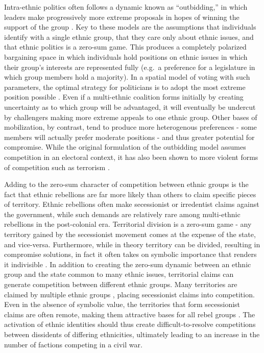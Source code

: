 \documentclass[12pt,]{book}
\begin{document}
Intra-ethnic politics often follows a dynamic known as ``outbidding,''
in which leaders make progressively more extreme proposals in hopes of
winning the support of the group \citep{Rabushka1972, horowitz85}. Key
to these models are the assumptions that individuals identify with a
single ethnic group, that they care only about ethnic issues, and that
ethnic politics is a zero-sum game. This produces a completely polarized
bargaining space in which individuals hold positions on ethnic issues in
which their group's interests are represented fully (e.g.~a preference
for a legislature in which group members hold a majority). In a spatial
model of voting with such parameters, the optimal strategy for
politicians is to adopt the most extreme position possible
\citep{Rabushka1972}. Even if a multi-ethnic coalition forms initially
by creating uncertainty as to which group will be advantaged, it will
eventually be undercut by challengers making more extreme appeals to one
ethnic group. Other bases of mobilization, by contrast, tend to produce
more heterogenous preferences - some members will actually prefer
moderate positions - and thus greater potential for compromise. While
the original formulation of the outbidding model assumes competition in
an electoral context, it has also been shown to more violent forms of
competition such as terrorism
\citetext{\citealp{Kydd2006}; \citealp{Chenoweth2010}; \citealp[but
see][]{Findley2012a}}.

Adding to the zero-sum character of competition between ethnic groups is
the fact that ethnic rebellions are far more likely than others to claim
specific pieces of territory. Ethnic rebellions often make secessionist
or irredentist claims against the government, while such demands are
relatively rare among multi-ethnic rebellions in the post-colonial era.
Territorial division is a zero-sum game - any territory gained by the
secessionist movement comes at the expense of the state, and vice-versa.
Furthermore, while in theory territory can be divided, resulting in
compromise solutions, in fact it often takes on symbolic importance that
renders it indivisible \citep{Toft2003}. In addition to creating the
zero-sum dynamic between an ethnic group and the state common to many
ethnic issues, territorial claims can generate competition between
different ethnic groups. Many territories are claimed by multiple ethnic
groups \citep{Toft2003}, placing secessionist claims into competition.
Even in the absence of symbolic value, the territories that form
secessionist claims are often remote, making them attractive bases for
all rebel groups \citep{Fjelde2012}. The activation of ethnic identities
should thus create difficult-to-resolve competitions between dissidents
of differing ethnicities, ultimately leading to an increase in the
number of factions competing in a civil war.
\end{document}
